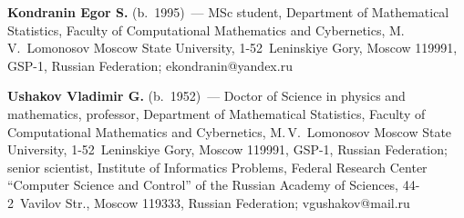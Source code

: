 \Contr

\noindent
\textbf{Kondranin Egor S.} (b.\ 1995)~---  MSc student, Department of 
Mathematical Statistics, Faculty of Computational Mathematics and Cybernetics, 
M.\,V.~Lomonosov Moscow State University, 1-52~Leninskiye Gory, 
Moscow 119991, GSP-1, Russian Federation; \mbox{ekondranin@yandex.ru}

\vspace*{6pt}

\noindent
\textbf{Ushakov Vladimir G.} (b.\ 1952)~--- 
Doctor of Science in physics and mathematics, professor, Department of Mathematical 
Statistics, Faculty of Computational Mathematics and Cybernetics, 
M.\,V.~Lomonosov Moscow State University, 1-52~Leninskiye Gory, Moscow 119991, 
GSP-1, Russian Federation; 
senior scientist, Institute of Informatics Problems, Federal Research Center 
``Computer Science and Control'' of the Russian Academy of Sciences, 
44-2~Vavilov Str., Moscow 119333, Russian Federation; \mbox{vgushakov@mail.ru}
\label{end\stat}

\renewcommand{\bibname}{\protect\rm Литература}       